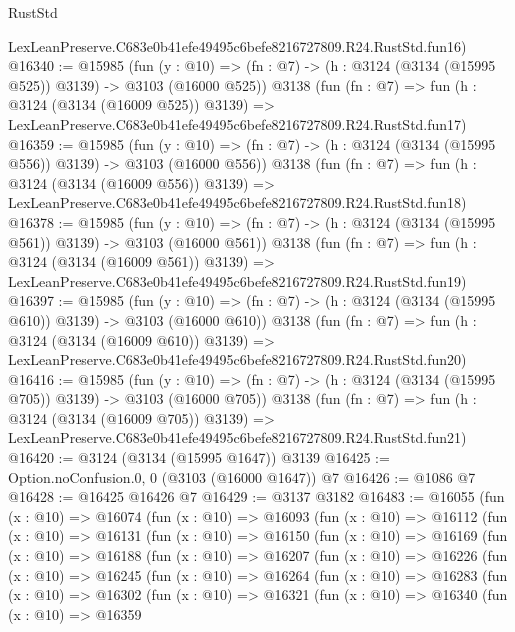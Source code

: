 \begin{lexlean}{RustStd}
\begin{coremodule}
    LexLeanPreserve.C683e0b41efe49495c6befe8216727809.R24.RustStd.fun16)
@16340 := @15985
    (fun (y : @10) => (fn : @7) -> (h : @3124 (@3134 (@15995 @525)) @3139) -> @3103 (@16000 @525))
    @3138
    (fun (fn : @7) =>
    fun (h : @3124 (@3134 (@16009 @525)) @3139) =>
    LexLeanPreserve.C683e0b41efe49495c6befe8216727809.R24.RustStd.fun17)
@16359 := @15985
    (fun (y : @10) => (fn : @7) -> (h : @3124 (@3134 (@15995 @556)) @3139) -> @3103 (@16000 @556))
    @3138
    (fun (fn : @7) =>
    fun (h : @3124 (@3134 (@16009 @556)) @3139) =>
    LexLeanPreserve.C683e0b41efe49495c6befe8216727809.R24.RustStd.fun18)
@16378 := @15985
    (fun (y : @10) => (fn : @7) -> (h : @3124 (@3134 (@15995 @561)) @3139) -> @3103 (@16000 @561))
    @3138
    (fun (fn : @7) =>
    fun (h : @3124 (@3134 (@16009 @561)) @3139) =>
    LexLeanPreserve.C683e0b41efe49495c6befe8216727809.R24.RustStd.fun19)
@16397 := @15985
    (fun (y : @10) => (fn : @7) -> (h : @3124 (@3134 (@15995 @610)) @3139) -> @3103 (@16000 @610))
    @3138
    (fun (fn : @7) =>
    fun (h : @3124 (@3134 (@16009 @610)) @3139) =>
    LexLeanPreserve.C683e0b41efe49495c6befe8216727809.R24.RustStd.fun20)
@16416 := @15985
    (fun (y : @10) => (fn : @7) -> (h : @3124 (@3134 (@15995 @705)) @3139) -> @3103 (@16000 @705))
    @3138
    (fun (fn : @7) =>
    fun (h : @3124 (@3134 (@16009 @705)) @3139) =>
    LexLeanPreserve.C683e0b41efe49495c6befe8216727809.R24.RustStd.fun21)
@16420 := @3124 (@3134 (@15995 @1647)) @3139
@16425 := Option.noConfusion.{0, 0} (@3103 (@16000 @1647)) @7
@16426 := @1086 @7
@16428 := @16425 @16426 @7
@16429 := @3137 @3182
@16483 := @16055
    (fun (x : @10) =>
    @16074
      (fun (x : @10) =>
      @16093
        (fun (x : @10) =>
        @16112
          (fun (x : @10) =>
          @16131
            (fun (x : @10) =>
            @16150
              (fun (x : @10) =>
              @16169
                (fun (x : @10) =>
                @16188
                  (fun (x : @10) =>
                  @16207
                    (fun (x : @10) =>
                    @16226
                      (fun (x : @10) =>
                      @16245
                        (fun (x : @10) =>
                        @16264
                          (fun (x : @10) =>
                          @16283
                            (fun (x : @10) =>
                            @16302
                              (fun (x : @10) =>
                              @16321
                                (fun (x : @10) =>
                                @16340
                                  (fun (x : @10) =>
                                  @16359

\end{coremodule}
\end{lexlean}
